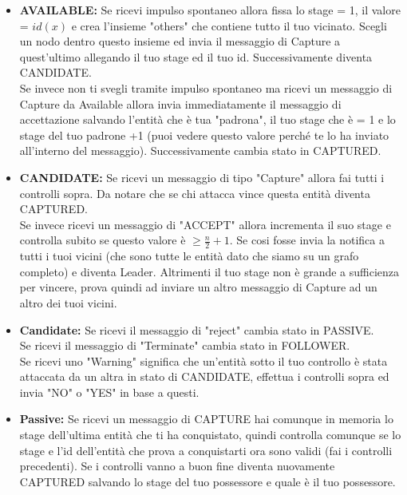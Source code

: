 \begin{itemize}
    \item \textbf{AVAILABLE:} Se ricevi impulso spontaneo allora fissa lo stage
          = 1, il valore = $id(x)$ e crea l'insieme "others" che contiene tutto
          il tuo vicinato. Scegli un nodo dentro questo insieme ed invia il
          messaggio di Capture a quest'ultimo allegando il tuo stage ed il tuo
          id. Successivamente diventa CANDIDATE.\\
          Se invece non ti svegli tramite impulso spontaneo ma ricevi un messaggio
          di Capture da Available allora invia immediatamente il messaggio di
          accettazione salvando l'entità che è tua "padrona", il tuo stage che è =
          1 e lo stage del tuo padrone +1 (puoi vedere questo valore perché te lo
          ha inviato all'interno del messaggio). Successivamente cambia stato in
          CAPTURED.
    \item \textbf{CANDIDATE:} Se ricevi un messaggio di tipo "Capture" allora fai
          tutti i controlli sopra. Da notare che se chi attacca vince questa entità
          diventa CAPTURED.\\
          Se invece ricevi un messaggio di "ACCEPT" allora incrementa il suo stage
          e controlla subito se questo valore è $\geq \frac{n}{2} +1$. Se cosi
          fosse invia la notifica a tutti i tuoi vicini (che sono tutte le entità
          dato che siamo su un grafo completo) e diventa Leader. Altrimenti il tuo
          stage non è grande a sufficienza per vincere, prova quindi ad inviare un
          altro messaggio di Capture ad un altro dei tuoi vicini.
    \item \textbf{Candidate:} Se ricevi il messaggio di "reject" cambia stato in
          PASSIVE. \\ Se ricevi il messaggio di "Terminate" cambia stato in
          FOLLOWER. \\ Se ricevi uno "Warning" significa che un'entità sotto il
          tuo controllo è stata attaccata da un altra in stato di CANDIDATE,
          effettua i controlli sopra ed invia "NO" o "YES" in base a questi.
    \item \textbf{Passive:} Se ricevi un messaggio di CAPTURE hai comunque in
          memoria lo stage dell'ultima entità che ti ha conquistato, quindi controlla
          comunque se lo stage e l'id dell'entità che prova a conquistarti ora sono
          validi (fai i controlli precedenti). Se i controlli vanno a buon fine diventa
          nuovamente CAPTURED salvando lo stage del tuo possessore e quale è il tuo
          possessore.
\end{itemize}

